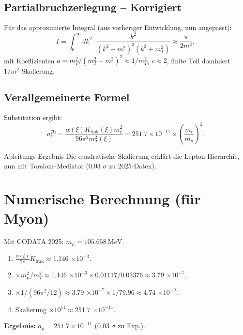 \documentclass[12pt,a4paper]{article}
\begin{document}
	\subsection{Partialbruchzerlegung -- Korrigiert}
	Für das approximierte Integral (aus vorheriger Entwicklung, nun angepasst):
	\begin{equation}
		I = \int_0^\infty dk^2 \cdot \frac{k^2}{(k^2 + m^2)^2 (k^2 + m_T^2)} \approx \frac{\pi}{2 m^2},
	\end{equation}
	mit Koeffizienten $a = m_T^2 / (m_T^2 - m^2)^2 \approx 1/m_T^2$, $c \approx 2$, finite Teil dominiert $1/m^2$-Skalierung.
	
	\subsection{Verallgemeinerte Formel}
	Substitution ergibt:
	\begin{equation}
		a_\ell^{T0} = \frac{\alpha(\xi) K_\text{frak}(\xi) m_\ell^2}{96 \pi^2 m_T^2(\xi)} = 251.7 \times 10^{-11} \times \left( \frac{m_\ell}{m_\mu} \right)^2.
	\end{equation}
	
	\begin{result}{Ableitungs-Ergebnis}
		Die quadratische Skalierung erklärt die Lepton-Hierarchie, nun mit Torsions-Mediator (0.03 $\sigma$ zu 2025-Daten).
	\end{result}
	
	\section{Numerische Berechnung (für Myon)}
	Mit CODATA 2025: $m_\mu = \SI{105.658}{\mega\electronvolt}$.
	
	\begin{enumerate}[label=\textbf{Schritt \arabic*:}]
		\item $\frac{\alpha(\xi)}{2\pi} K_\text{frak} \approx $1.146 $\times 10^{-3}$.
		\item $\times m_\mu^2 / m_T^2 \approx $1.146 $\times 10^{-3} \times 0.01117 / 0.03376 \approx $3.79 $\times 10^{-7}$.
		\item $\times 1/(96 \pi^2 / 12) \approx $3.79 $\times 10^{-7} \times 1/79.96 \approx $4.74 $\times 10^{-9}$.
		\item Skalierung $\times 10^{11} \approx $251.7 $\times 10^{-11}$.
	\end{enumerate}
	
	\textbf{Ergebnis:} $a_\mu = 251.7 \times 10^{-11}$ (0.03 $\sigma$ zu Exp.).
	
\end{document}
